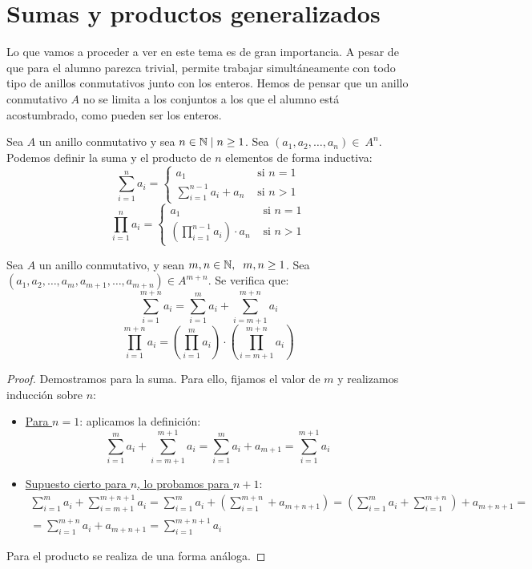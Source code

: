 \section{Sumas y productos generalizados}
Lo que vamos a proceder a ver en este tema es de gran importancia. A pesar de que para el alumno parezca trivial, permite trabajar simultáneamente con todo tipo de anillos conmutativos junto con los enteros. Hemos de pensar que un anillo conmutativo $A$ no se limita a los conjuntos a los que el alumno está acostumbrado, como pueden ser los enteros.

\begin{definicion}
    Sea $A$ un anillo conmutativo y sea $n\in \mathbb N \mid n\geq 1$. Sea $(a_1, a_2, \ldots, a_n)\in~A^n$.
    Podemos definir la suma y el producto de $n$ elementos de forma inductiva:
    $$\sum_{i=1}^n a_i = \left\{ \begin{array}{cl}
            a_1                               & \mbox{ si } n=1   \\
            \sum\limits_{i=1}^{n-1} a_i + a_n & \mbox{ si } n > 1
        \end{array} \right.$$
    $$\prod_{i=1}^n a_i = \left\{ \begin{array}{cl}
            a_1                                                 & \mbox{ si } n=1   \\
            \left(\prod\limits_{i=1}^{n-1} a_i\right) \cdot a_n & \mbox{ si } n > 1
        \end{array} \right.$$
\end{definicion}

\begin{prop}
    Sea $A$ un anillo conmutativo, y sean $m,n\in\mathbb N,\;\;m,n\geq 1$. Sea $(a_1, a_2, \ldots, a_m, a_{m+1}, \ldots, a_{m+n}) \in A^{m+n}$. Se verifica que:
    $$\sum_{i=1}^{m+n} a_i = \sum_{i=1}^m a_i + \sum_{i=m+1}^{m+n} a_i$$
    $$\prod_{i=1}^{m+n} a_i = \left(\prod_{i=1}^m a_i\right) \cdot \left(\prod_{i=m+1}^{m+n} a_i\right)$$
\end{prop}
\begin{proof}
    Demostramos para la suma. Para ello, fijamos el valor de $m$ y realizamos inducción sobre $n$:
    \begin{itemize}
        \item \underline{Para $n=1$}: aplicamos la definición:
        $$\sum_{i=1}^m a_i + \sum_{i=m+1}^{m+1} a_i = \sum_{i=1}^m a_i + a_{m+1} = \sum_{i=1}^{m+1} a_i$$

        \item \underline{Supuesto cierto para $n$, lo probamos para $n+1$}:
        \begin{multline*}
            \sum_{i=1}^m a_i + \sum_{i=m+1}^{m+n+1} a_i = \sum_{i=1}^m a_i + \left( \sum_{i=1}^{m+n} + a_{m+n+1} \right) = \left( \sum_{i=1}^m a_i + \sum_{i=1}^{m+n}\right) + a_{m+n+1} = \\
            =\sum_{i=1}^{m+n} a_i + a_{m+n+1} = \sum_{i=1}^{m+n+1} a_i
        \end{multline*}
    \end{itemize}
    Para el producto se realiza de una forma análoga.
\end{proof}


